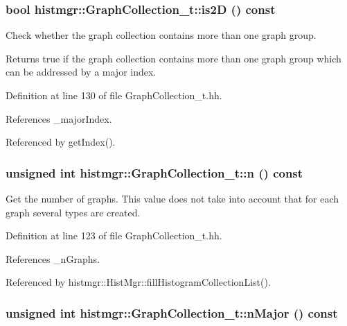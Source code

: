 \subsubsection[{is2D}]{\setlength{\rightskip}{0pt plus 5cm}bool histmgr::GraphCollection\_\-t::is2D () const\hspace{0.3cm}{\ttfamily  [inline]}}\label{classhistmgr_1_1GraphCollection__t_a67af785a9177d9c41e5f7f3251c2d75b}


Check whether the graph collection contains more than one graph group. \begin{DoxyReturn}{Returns}
true if the graph collection contains more than one graph group which can be addressed by a major index. 
\end{DoxyReturn}


Definition at line 130 of file GraphCollection\_\-t.hh.

References \_\-majorIndex.

Referenced by getIndex().
\subsubsection[{n}]{\setlength{\rightskip}{0pt plus 5cm}unsigned int histmgr::GraphCollection\_\-t::n () const\hspace{0.3cm}{\ttfamily  [inline]}}\label{classhistmgr_1_1GraphCollection__t_a6ee4913773c2949d5cf3a167038f9a3d}


Get the number of graphs. This value does not take into account that for each graph several types are created. 

Definition at line 123 of file GraphCollection\_\-t.hh.

References \_\-nGraphs.

Referenced by histmgr::HistMgr::fillHistogramCollectionList().
\subsubsection[{nMajor}]{\setlength{\rightskip}{0pt plus 5cm}unsigned int histmgr::GraphCollection\_\-t::nMajor () const\hspace{0.3cm}{\ttfamily  [inline]}}\label{classhistmgr_1_1GraphCollection__t_ac28f1f78b0326c5e91c40a8d74bb0b49}


